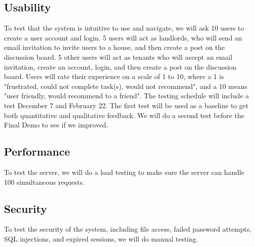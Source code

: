 \documentclass[12pt]{article}
\begin{document}
\subsection{Usability}
To test that the system is intuitive to use and navigate, we will ask 10 users to create a user account and login. 5 users will act as landlords, who will send an email invitation to invite users to a house, and then create a post on the discussion board. 5 other users will act as tenants who will accept an email invitation, create an account, login, and then create a post on the discussion board. Users will rate their experience on a scale of 1 to 10, where a 1 is "frustrated, could not complete task(s), would not recommend", and a 10 means "user friendly, would recommend to a friend". The testing schedule will include a test December 7 and February 22. The first test will be used as a baseline to get both quantitative and qualitative feedback. We will do a second test before the Final Demo to see if we improved.

\subsection{Performance}
To test the server, we will do a load testing to make sure the server can handle 100 simultaneous requests.

\subsection{Security}
To test the security of the system, including file access, failed password attempts, SQL injections, and expired sessions, we will do manual testing.
\end{document}
